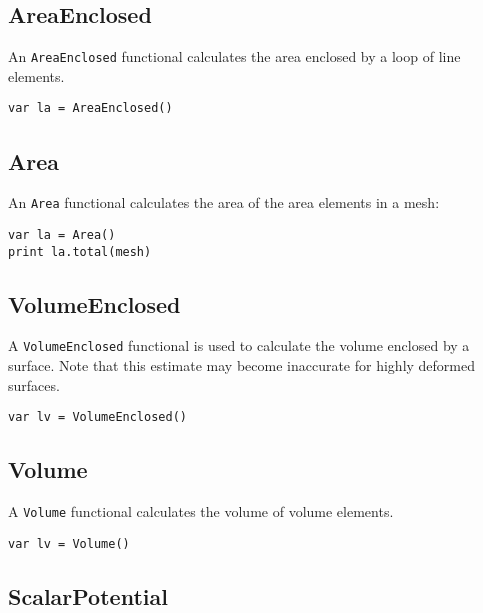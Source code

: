 \hypertarget{areaenclosed}{%
\subsection{AreaEnclosed}\label{areaenclosed}}

An \texttt{AreaEnclosed} functional calculates the area enclosed by a
loop of line elements.

\begin{lstlisting}
var la = AreaEnclosed()
\end{lstlisting}

\hypertarget{area}{%
\subsection{Area}\label{area}}

An \texttt{Area} functional calculates the area of the area elements in
a mesh:

\begin{lstlisting}
var la = Area()
print la.total(mesh)
\end{lstlisting}

\hypertarget{volumeenclosed}{%
\subsection{VolumeEnclosed}\label{volumeenclosed}}

A \texttt{VolumeEnclosed} functional is used to calculate the volume
enclosed by a surface. Note that this estimate may become inaccurate for
highly deformed surfaces.

\begin{lstlisting}
var lv = VolumeEnclosed()
\end{lstlisting}

\hypertarget{volume}{%
\subsection{Volume}\label{volume}}

A \texttt{Volume} functional calculates the volume of volume elements.

\begin{lstlisting}
var lv = Volume()
\end{lstlisting}

\hypertarget{scalarpotential}{%
\subsection{ScalarPotential}\label{scalarpotential}}

